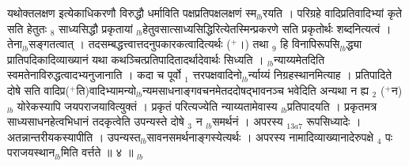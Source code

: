 \documentclass[article,12pt,a4paper]{memoir}%
\newcommand{\add}[1]{($^{+}$#1)}
\newcounter{parCount}
\begin{document}
	  
	  \pstart \leavevmode%
	यथोक्तलक्षण इत्येकाधिकरणौ विरुद्धौ धर्माविति पक्षप्रतिपक्षलक्षणं स्म{\tiny $_{lb}$}रयति । परिग्रहे वादिप्रतिवादिभ्यां कृते सति हेतुतः {\tiny $_{8}$} साध्यसिद्धौ प्रकृतायां {\tiny $_{lb}$}हेतुवसात्साध्यसिद्धिरित्येतस्मिन्प्रकरणे सति प्रकृतोर्थः शब्दनित्यत्वं । तेना{\tiny $_{lb}$}सङ्गतत्वात् । तदसम्बद्धत्त्वात्तदनुपकारकत्वादित्यर्थः \add{।} तथा {\tiny $_{9}$} \leavevmode{} हि विनापिरूपसि{\tiny $_{lb}$}द्ध्या प्रातिपदिकादिव्याख्यानं यथा कथञ्चित्प्रतिपादितादर्थादेवार्थः सिध्यति । {\tiny $_{lb}$}न्याय्यमेतदिति स्वमतेनाविरुद्धत्वादभ्यनुजानाति । कदा च पूर्वो {\tiny $_{1}$} त्तरपक्षवादिनो{\tiny $_{lb}$}र्न्याय्यं निग्रहस्थानमित्याह । प्रतिपादिते दोषे सति वादिप्र\add{ति}वादिभ्यामन्यो{\tiny $_{lb}$}न्यमसाधनाङ्गवचनमेतददोषद्भावनञ्च भवेदिति अन्यथा न ह्य {\tiny $_{2}$} \add{न}{\tiny $_{lb}$}\leavevmode{} योरेकस्यापि जयपराजयावित्युक्तं । प्रकृतं परित्यज्येति न्याय्यतामेवास्य {\tiny $_{lb}$}प्रतिपादयति । प्रकृतमत्र साध्यसाधनहेत्वभिधानं तदकृत्वेति उपन्यस्ते दोषे {\tiny $_{3}$} न {\tiny $_{lb}$}समर्थनं । {\color{DodgerBlue3}अपरस्य} {\tiny $_{13a7}$} रूपसिध्यादेः । अतन्नान्तरीयकस्यापीति । उपन्यस्त{\tiny $_{lb}$}सावनसमर्थनाङ्गस्येत्यर्थः । अपरस्य नामादिव्याख्यानादेरुपक्षे {\tiny $_{4}$} पः पराजयस्थान{\tiny $_{lb}$}मिति वर्त्तते ॥ ४ ॥
	{}
	\pend%
      {\tiny $_{lb}$}
\end{document}
